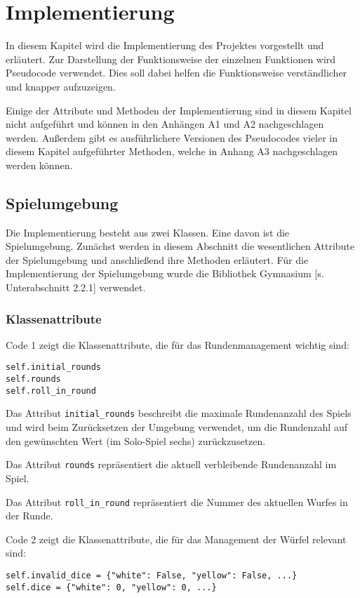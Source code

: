 \section{Implementierung}
In diesem Kapitel wird die Implementierung des Projektes vorgestellt und erläutert. Zur Darstellung der Funktionsweise der einzelnen Funktionen wird Pseudocode verwendet. Dies soll dabei helfen die Funktionsweise verständlicher und knapper aufzuzeigen.

Einige der Attribute und Methoden der Implementierung sind in diesem Kapitel nicht aufgeführt und können in den Anhängen A1 und A2 nachgeschlagen werden. Außerdem gibt es ausführlichere Versionen des Pseudocodes vieler in diesem Kapitel aufgeführter Methoden, welche in Anhang A3 nachgeschlagen werden können.
\subsection{Spielumgebung}
Die Implementierung besteht aus zwei Klassen. Eine davon ist die Spielumgebung. Zunächst werden in diesem Abschnitt die wesentlichen Attribute der Spielumgebung und anschließend ihre Methoden erläutert. Für die Implementierung der Spielumgebung wurde die Bibliothek Gymnasium [s. Unterabschnitt 2.2.1] verwendet.
\subsubsection{Klassenattribute}
\begin{minipage}{\linewidth}
Code 1 zeigt die Klassenattribute, die für das Rundenmanagement wichtig sind:
\vspace{0.5cm}
\begin{lstlisting}[caption={Klassenattribute für das Runden-System}, basicstyle=\ttfamily]
self.initial_rounds
self.rounds
self.roll_in_round
\end{lstlisting}
\end{minipage}

Das Attribut \texttt{initial\_rounds} beschreibt die maximale Rundenanzahl des Spiels und wird beim Zurücksetzen der Umgebung verwendet, um die Rundenzahl auf den gewünschten Wert (im Solo-Spiel sechs) zurückzusetzen.

Das Attribut \texttt{rounds} repräsentiert die aktuell verbleibende Rundenanzahl im Spiel.

Das Attribut \texttt{roll\_in\_round} repräsentiert die Nummer des aktuellen Wurfes in der Runde.\\

\begin{minipage}{\linewidth}
Code 2 zeigt die Klassenattribute, die für das Management der Würfel relevant sind:
\vspace{0.5cm}
\begin{lstlisting}[caption={Klassenattribute für Würfel}, basicstyle=\ttfamily]
self.invalid_dice = {"white": False, "yellow": False, ...}
self.dice = {"white": 0, "yellow": 0, ...}
\end{lstlisting}
\end{minipage}

